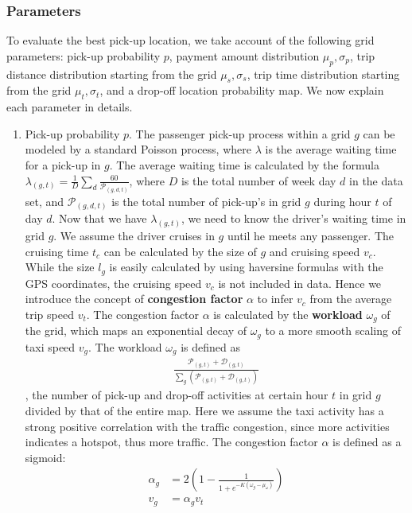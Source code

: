 \documentclass[letterpaper, 10 pt, conference]{ieeeconf}
\begin{document}
\subsubsection{Parameters}
To evaluate the best pick-up location, we take account of the following grid parameters: pick-up probability $p$, payment amount distribution $\mu_p, \sigma_p$, trip distance distribution starting from the grid $\mu_s, \sigma_s$, trip time distribution starting from the grid $\mu_t, \sigma_t$, and a drop-off location probability map. We now explain each parameter in details.
\begin{enumerate}
\item Pick-up probability $p$. The passenger pick-up process within a grid $g$ can be modeled by a standard Poisson process, where $\lambda$ is the average waiting time for a pick-up in $g$. The average waiting time is calculated by the formula $\lambda_{(g,t)} = \frac{1}{D}\sum_d\frac{60}{\mathcal{P}_{(g,d,t)}}$, where $D$ is the total number of week day $d$ in the data set, and $\mathcal{P}_{(g,d,t)}$ is the total number of pick-up's in grid $g$ during hour $t$ of day $d$. Now that we have $\lambda_{(g,t)}$, we need to know the driver's waiting time in grid $g$. We assume the driver cruises in $g$ until he meets any passenger. The cruising time $t_c$ can be calculated by the size of $g$ and cruising speed $v_c$. While the size $l_g$ is easily calculated by using haversine formulas with the GPS coordinates, the cruising speed $v_c$ is not included in data. Hence we introduce the concept of \textbf{congestion factor} $\alpha$ to infer $v_c$ from the average trip speed $v_t$. The congestion factor $\alpha$ is calculated by the \textbf{workload} $\omega_g$ of the grid, which maps an exponential decay of $\omega_g$ to a more smooth scaling of taxi speed $v_g$. The workload $\omega_g$ is defined as
\begin{align}
\frac{\mathcal{P}_{(g,t)}+\mathcal{D}_{(g,t)}}{\sum_{g}(\mathcal{P}_{(g,t)}+\mathcal{D}_{(g,t)})}
\end{align}, the number of pick-up and drop-off activities at certain hour $t$ in grid $g$ divided by that of the entire map. Here we assume the taxi activity has a strong positive correlation with the traffic congestion, since more activities indicates a hotspot, thus more traffic. The congestion factor $\alpha$ is defined as a sigmoid:
\begin{align}
\alpha_g &= 2(1-\frac{1}{1+e^{-K(\omega_g-\mu_\omega)}})\\
v_g &= \alpha_gv_t
\end{align}

\end{enumerate}
\end{document}
